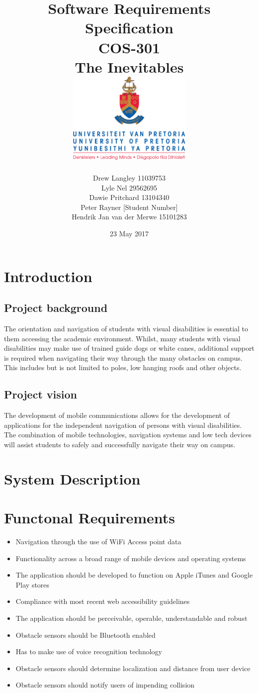 \documentclass{article}
\title{ Software Requirements Specification \\ COS-301 \\ The Inevitables \\[0.5cm] \includegraphics[width=6cm]{front-page}}
\author{Drew Langley \hfill 11039753 \\ Lyle Nel \hfill 29562695 \\ Dawie Pritchard \hfill 13104340 \\  Peter Rayner \hfill [Student Number]\\ Hendrik Jan van der Merwe \hfill 15101283 }
\date{23 May 2017}
\begin{document}
\maketitle
\pagebreak
\tableofcontents
\pagebreak


\section{Introduction}
\subsection{Project background}
The orientation and navigation of students with visual disabilities is essential to them accessing the academic environment. Whilst, many students with visual disabilities may make use of trained guide dogs or white canes, additional support is required when navigating their way through the many obstacles on campus. This includes but is not limited to poles, low hanging roofs and other objects.

\subsection{Project vision}
The development of mobile communications allows for the development of applications for the independent navigation of persons with visual disabilities. The combination of mobile technologies, navigation systems and low tech devices will assist students to safely and successfully navigate their way on campus.

\section{System Description}
\section{Functonal Requirements}
\begin{itemize}
	\item Navigation through the use of WiFi Access point data
	\item Functionality across a broad range of mobile devices and operating systems
	\item The application should be developed to function on Apple iTunes and Google Play stores
	\item Compliance with most recent web accessibility guidelines
	\item The application should be perceivable, operable, understandable and robust
	\item Obstacle sensors should be Bluetooth enabled
	\item Has to make use of voice recognition technology
	\item Obstacle sensors should determine localization and distance from user device
	\item Obstacle sensors should notify users of impending collision
\end{itemize}
\end{document}
